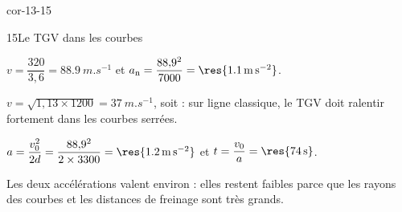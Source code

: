 \begin{blocLivre}{cor-13-15}
\begin{corrige}{15}{Le TGV dans les courbes}
\begin{questions}
\item $v=\dfrac{320}{3{,}6}=\qty{88,9}{m.s^{-1}}$ et $a_\mathrm{n}=\dfrac{88{,}9^2}{7000}=\res{\qty{1,1}{m.s^{-2}}}$.
\item $v=\sqrt{1{,}13\times1200}=\qty{37}{m.s^{-1}}$, soit  : sur ligne classique, le TGV doit
ralentir fortement dans les courbes serrées.
\item $a=\dfrac{v_0^2}{2d}=\dfrac{88{,}9^2}{2\times3300}=\res{\qty{1,2}{m.s^{-2}}}$ et $t=\dfrac{v_0}{a}=\res{\qty{74}{s}}$.
\item Les deux accélérations valent environ  : elles restent faibles parce que les rayons des courbes et
les distances de freinage sont très grands.
\end{questions}
\end{corrige}
\end{blocLivre}
